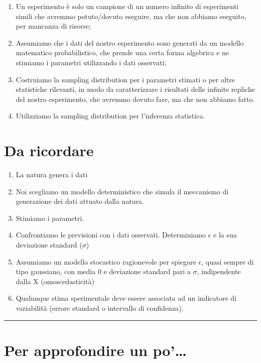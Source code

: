 \documentclass[a4paper,12pt,oneside]{book}
\providecommand{\tightlist}{%
  \setlength{\itemsep}{0pt}\setlength{\parskip}{0pt}}
\begin{document}
\begin{enumerate}
\def\labelenumi{\arabic{enumi}.}
\tightlist
\item
  Un esperimento è solo un campione di un numero infinito di esperimenti simili che avremmo potuto/dovuto eseguire, ma che non abbiamo eseguito, per mancanza di risorse;
\item
  Assumiamo che i dati del nostro esperimento sono generati da un modello matematico probabilistico, che prende una certa forma algebrica e ne stimiamo i parametri utilizzando i dati osservati;
\item
  Costruiamo la sampling distribution per i parametri stimati o per altre statistiche rilevanti, in modo da caratterizzare i risultati delle infinite repliche del nostro esperimento, che avremmo dovuto fare, ma che non abbiamo fatto.
\item
  Utilizziamo la sampling distribution per l'inferenza statistica.
\end{enumerate}

\hypertarget{da-ricordare}{%
\section{Da ricordare}\label{da-ricordare}}

\begin{enumerate}
\def\labelenumi{\arabic{enumi}.}
\tightlist
\item
  La natura genera i dati
\item
  Noi scegliamo un modello deterministico che simula il meccanismo di generazione dei dati attuato dalla natura.
\item
  Stimiamo i parametri.
\item
  Confrontiamo le previsioni con i dati osservati. Determiniamo \(\epsilon\) e la sua deviazione standard (\(\sigma\))
\item
  Assumiamo un modello stocastico ragionevole per spiegare \(\epsilon\), quasi sempre di tipo gaussiano, con media 0 e deviazione standard pari a \(\sigma\), indipendente dalla X (omoscedasticità)
\item
  Qualunque stima sperimentale deve essere associata ad un indicatore di variabilità (errore standard o intervallo di confidenza).
\end{enumerate}

\begin{center}\rule{0.5\linewidth}{0.5pt}\end{center}

\hypertarget{per-approfondire-un-po}{%
\section{Per approfondire un po'\ldots{}}\label{per-approfondire-un-po}}
\end{document}

